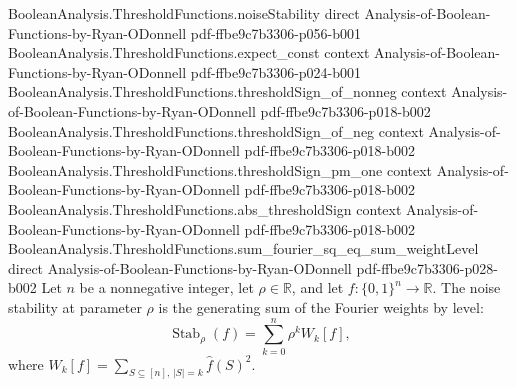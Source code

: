 \begin{lemma}
\proofstep
  {BooleanAnalysis.ThresholdFunctions.noiseStability}
  {direct}
  {Analysis-of-Boolean-Functions-by-Ryan-ODonnell}
  {pdf-ffbe9c7b3306-p056-b001}
\proofstep
  {BooleanAnalysis.ThresholdFunctions.expect_const}
  {context}
  {Analysis-of-Boolean-Functions-by-Ryan-ODonnell}
  {pdf-ffbe9c7b3306-p024-b001}
\proofstep
  {BooleanAnalysis.ThresholdFunctions.thresholdSign_of_nonneg}
  {context}
  {Analysis-of-Boolean-Functions-by-Ryan-ODonnell}
  {pdf-ffbe9c7b3306-p018-b002}
\proofstep
  {BooleanAnalysis.ThresholdFunctions.thresholdSign_of_neg}
  {context}
  {Analysis-of-Boolean-Functions-by-Ryan-ODonnell}
  {pdf-ffbe9c7b3306-p018-b002}
\proofstep
  {BooleanAnalysis.ThresholdFunctions.thresholdSign_pm_one}
  {context}
  {Analysis-of-Boolean-Functions-by-Ryan-ODonnell}
  {pdf-ffbe9c7b3306-p018-b002}
\proofstep
  {BooleanAnalysis.ThresholdFunctions.abs_thresholdSign}
  {context}
  {Analysis-of-Boolean-Functions-by-Ryan-ODonnell}
  {pdf-ffbe9c7b3306-p018-b002}
\proofstep
  {BooleanAnalysis.ThresholdFunctions.sum_fourier_sq_eq_sum_weightLevel}
  {direct}
  {Analysis-of-Boolean-Functions-by-Ryan-ODonnell}
  {pdf-ffbe9c7b3306-p028-b002}
Let $n$ be a nonnegative integer, let $\rho\in\mathbb R$, and let
$f\colon\{0,1\}^n\to\mathbb R$. The noise stability at parameter $\rho$ is the
generating sum of the Fourier weights by level:
$$\operatorname{Stab}_{\rho}(f)=\sum_{k=0}^{n}\rho^k W_k[f],$$ where
$W_k[f]=\sum_{S\subseteq[n],\,|S|=k}\widehat f(S)^2$.
\end{lemma}

